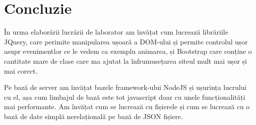 \section*{Concluzie}

În urma elaborării lucrării de laborator am învățat cum lucrează librăriile JQuery, care perimite manipularea ușoară a DOM-ului și permite controlul ușor asupr evenimentlor ce le vedem ca exemplu animarea, și Bootstrap care conține o cantitate mare de clase care ma ajutat la înfrumusețarea siteul mult mai ușor și mai corect.

Pe bază de server am învățat bazele framework-ului NodeJS și ușurința lucrului cu el, așa cum limbajul de bază este tot javascript doar cu unele funcționalități mai performante.
Am învățat cum se lucrează cu fișierele și cum se lucrează cu o bază de date simplă nerelațională pe bază de JSON fișiere.



\clearpage